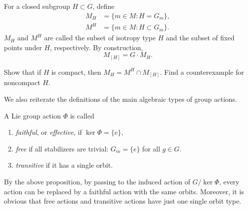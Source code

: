 \begin{defn}
    For a closed subgroup $H\subset G$, define
    \begin{align}
        M_H&=\{m\in M:H=G_m\},\\
        M^H&=\{m\in M:H\subset G_m\}.
    \end{align}
    $M_H$ and $M^H$ are called the subset of isotropy type $H$ and the subset of fixed points under $H$, respectively. By construction,
    \[M_{[H]}=G\cdot M_H.\]
\end{defn}

\begin{xca}
    Show that if $H$ is compact, then $M_H=M^H\cap M_{[H]}$. Find a counterexample for noncompact $H$.
\end{xca}

We also reiterate the definitions of the main algebraic types of group actions.

\begin{defn}
    A Lie group action $\Phi$ is called
    \begin{enumerate}
        \item \emph{faithful}, or \emph{effective}, if $\ker\Phi=\{e\}$,
        \item \emph{free} if all stabilizers are trivial: $G_m=\{e\}$ for all $g\in G$.
        \item \emph{transitive} if it has a single orbit.
    \end{enumerate}
\end{defn}

By the above proposition, by passing to the induced action of $G\slash\ker\Phi$, every action can be replaced by a faithful action with the same orbits. Moreover, it is obvious that free actions and transitive actions have just one single orbit type.

